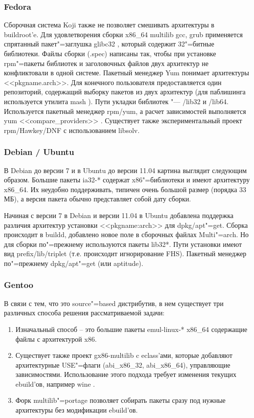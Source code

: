 \documentclass[10pt, a5paper]{article}
\begin{document}
\subsubsection*{Fedora}

Сборочная система Koji \cite{Sha4} также не позволяет смешивать архитектуры в buildroot'e. Для удовлетворения сборки x86\_64 multilib gcc, grub применяется спрятанный пакет"=заглушка glibc32 \cite{Sha5}, который содержит 32"=битные библиотеки. Файлы сборки (.spec) написаны так, чтобы при установке rpm"=пакеты библиотек и заголовочных файлов двух архитектур не конфликтовали в одной системе. Пакетный менеджер Yum понимает архитектуры <<pkgname.arch>>. Для конечного пользователя предоставляется один репозиторий, содержащий выборку пакетов из двух архитектур  (для паблишинга используется утилита mash \cite{Sha6}). Пути укладки библиотек "---  /lib32 и /lib64. Используется пакетный менеджер rpm/yum, а расчет зависимостей выполняется yum <<compare\_providers>> \cite{Sha7}. Существует также экспериментальный проект rpm/Hawkey/DNF с использованием libsolv.

\subsubsection*{Debian / Ubuntu}

В Debian до версии 7 и в Ubuntu до версии 11.04 картина выглядит следующим образом. Большие пакеты ia32-* \cite{Sha8} содержат x86"=библиотеки и имеют архитектуру x86\_64. Их неудобно поддерживать, типичен очень большой размер (порядка 33 МБ), а версия пакета обычно представляет собой дату сборки.

Начиная с версии 7 в Debian и версии 11.04 в Ubuntu добавлена поддержка различия архитектур установки <<pkgname:arch>> для dpkg/apt"=get. Сборка происходит в buildd, добавлено новое поле в сборочных файлах Multi"=arch. Но для сборки по"=прежнему используются  пакеты lib32*. Пути установки имеют вид prefix/lib/triplet (т.е. происходит игнорирование FHS). Пакетный менеджер по"=прежнему dpkg/apt"=get (или aptitude).

\subsubsection*{Gentoo}

В связи с тем, что это source"=based дистрибутив, в нем существует три различных способа решения рассматриваемой задачи\cite{Sha9}:

\begin{enumerate}
  \item Изначальный способ -- это большие пакеты emul-linux-* x86\_64 \cite{Sha10} содержащие файлы с архитектурой x86.
  \item Существует также проект gx86-multilib \cite{Sha11}c eclass'ами, которые добавляют архитектурные USE"=флаги (abi\_x86\_32, abi\_x86\_64), управляющие зависимостями. Использование этого подхода требует изменения текущих ebuild'ов, например wine \cite{Sha12}.
  \item Форк multilib"=portage позволяет собирать пакеты сразу под нужные архитектуры без модификации ebuild'ов.
\end{enumerate}
\end{document}
